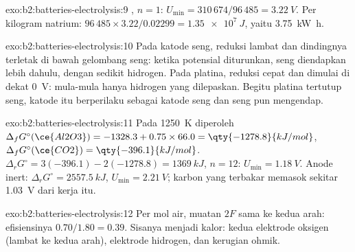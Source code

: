 \begin{solution}{exo:b2:batteries-electrolysis:9}
, $n = 1$: $U_{\min} = 310\,674/96\,485 = \qty{3.22}{V}$.
Per kilogram natrium: $96\,485 \times 3.22/0.02299 = \qty{1.35e7}{J}$, yaitu
\qty{3.75}{kW.h}.
\end{solution}

\begin{solution}{exo:b2:batteries-electrolysis:10}
Pada katode seng, reduksi  lambat dan dindingnya terletak di bawah
gelombang seng: ketika potensial diturunkan, seng diendapkan lebih dahulu,
dengan sedikit hidrogen. Pada platina, reduksi  cepat dan dimulai
di dekat \qty{0}{V}: mula-mula hanya hidrogen yang dilepaskan. Begitu
platina tertutup seng, katode itu berperilaku sebagai katode seng dan seng
pun mengendap.
\end{solution}

\begin{solution}{exo:b2:batteries-electrolysis:11}
Pada \qty{1250}{K} diperoleh $\Delta_f G^\circ(\ce{Al2O3}) = -1328.3 + 0.75 \times 66.0 =
\qty{-1278.8}{kJ/mol}$, $\Delta_f G^\circ(\ce{CO2}) = \qty{-396.1}{kJ/mol}$. $\Delta_r G^\circ =
3(-396.1) - 2(-1278.8) = \qty{1369}{kJ}$, $n = 12$: $U_{\min} = \qty{1.18}{V}$.
Anode inert: $\Delta_r G^\circ = \qty{2557.5}{kJ}$, $U_{\min} = \qty{2.21}{V}$;
karbon yang terbakar memasok sekitar \qty{1.03}{V} dari kerja itu.
\end{solution}

\begin{solution}{exo:b2:batteries-electrolysis:12}
Per mol air, muatan $2F$ sama ke kedua arah: efisiensinya $0.70/1.80 =
0.39$. Sisanya menjadi kalor:  kedua elektrode oksigen
(lambat ke kedua arah),  elektrode hidrogen, dan kerugian
ohmik.
\end{solution}

